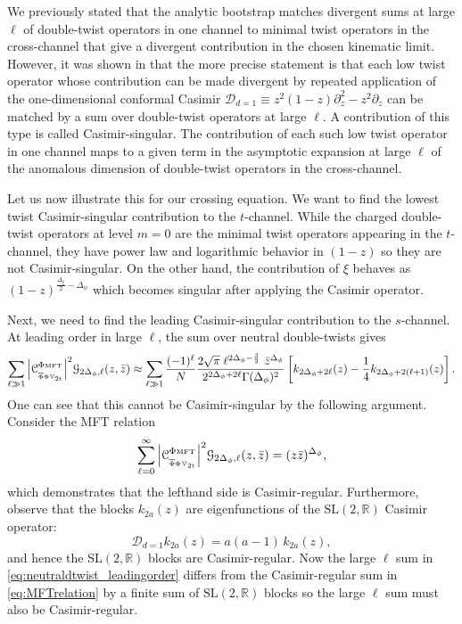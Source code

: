 \documentclass[11pt]{article}
\newcommand{\zb}{\bar{z}}
\newcommand{\Phib}{\overline{\Phi}}
\newcommand{\cope}[1]{\mathcal{C}_{_{#1}}}
\newcommand{\mft}{\text{\tiny MFT}}
\begin{document}
We previously stated that the analytic bootstrap matches divergent sums at large $\ell$ of double-twist operators in one channel to minimal twist operators in the cross-channel that give a divergent contribution in the chosen kinematic limit. However, it was shown in \cite{Alday:2015eya} that the more precise statement is that each low twist operator whose contribution can be made divergent by repeated application of the one-dimensional conformal Casimir $\mathcal{D}_{d=1} \equiv z^{2}(1-z)\partial_{z}^{2}-z^{2}\partial_{z}$ can be matched by a sum over double-twist operators at large $\ell$. A contribution of this type is called Casimir-singular. The contribution of each such low twist operator in one channel maps to a given term in the asymptotic expansion at large $\ell$ of the anomalous dimension of double-twist operators in the cross-channel. 

Let us now illustrate this for our crossing equation. We want to find the lowest twist Casimir-singular contribution to the $t$-channel. While the charged double-twist operators at level $m=0$ are the minimal twist operators appearing in the $t$-channel, they have power law and logarithmic behavior in $(1-z)$ so they are not Casimir-singular. On the other hand, the contribution of $\xi$ behaves as $(1-z)^{\frac{\Delta_{\xi}}{2}-\Delta_{\phi}}$ which becomes singular after applying the Casimir operator.

Next, we need to find the leading Casimir-singular contribution to the $s$-channel. At leading order in large $\ell$, the sum over neutral double-twists gives
%
\begin{equation}\label{eq:neutraldtwist_leadingorder}
\sum_{\ell \gg 1} \abs{\cope{\Phib\Phi\mathcal{V}_{\mathrm{2t}}}^{\Phi\mft}}^{2}\mathcal{G}_{2\Delta_{\phi},\ell}(z,\zb) \approx \sum_{\ell \gg 1} \frac{(-1)^\ell}{N}\frac{2\sqrt{\pi} \;  \ell^{2\Delta_{\phi}-\frac{3}{2}} \ \zb^{\Delta_{\phi}} }{2^{2\Delta_{\phi}+2\ell}\Gamma(\Delta_{\phi})^{2}}
  \left[k_{2\Delta_{\phi}+2\ell}(z)-\frac{1}{4}k_{2\Delta_{\phi}+2(\ell+1)}(z)\right].
\end{equation}
%
One can see that this cannot be Casimir-singular by the following argument. Consider the MFT relation
%
\begin{equation}\label{eq:MFTrelation}
\sum_{\ell = 0}^{\infty} \abs{\cope{\Phib\Phi\mathcal{V}_{\mathrm{2t}}}^{\Phi\mft}}^{2}\mathcal{G}_{2\Delta_{\phi},\ell}(z,\zb) = (z\zb)^{\Delta_{\phi}},
\end{equation}
%
which demonstrates that the lefthand side is Casimir-regular. Furthermore, observe that the blocks $k_{2a}(z)$ are eigenfunctions of the $\mathrm{SL}(2,\mathbb{R})$ Casimir operator:
%
\begin{equation}\label{eq:1dCasimir_eigenfn}
\mathcal{D}_{d=1}k_{2a}(z) = a(a-1)\, k_{2a}(z),
\end{equation}
%
and hence the $\mathrm{SL}(2,\mathbb{R})$ blocks are Casimir-regular. Now the large $\ell$ sum in \eqref{eq:neutraldtwist_leadingorder} differs from the Casimir-regular sum in \eqref{eq:MFTrelation} by a finite sum of $\mathrm{SL}(2,\mathbb{R})$ blocks so the large $\ell$ sum must also be Casimir-regular. 
\end{document}
